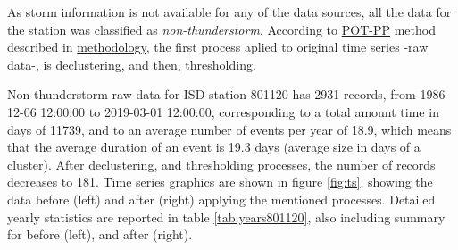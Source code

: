 \documentclass[12pt,oneside]{reedthesis}
\begin{document}
As storm information is not available for any of the data sources, all the data for the station was classified as \emph{non-thunderstorm}. According to \protect\hyperlink{pot-pp}{POT-PP} method described in \protect\hyperlink{rmd-method}{methodology}, the first process aplied to original time series -raw data-, is \protect\hyperlink{decluster}{declustering}, and then, \protect\hyperlink{thresholding}{thresholding}.

Non-thunderstorm raw data for ISD station 801120 has 2931 records, from 1986-12-06 12:00:00 to 2019-03-01 12:00:00, corresponding to a total amount time in days of 11739, and to an average number of events per year of 18.9, which means that the average duration of an event is 19.3 days (average size in days of a cluster). After \protect\hyperlink{decluster}{declustering}, and \protect\hyperlink{thresholding}{thresholding} processes, the number of records decreases to 181. Time series graphics are shown in figure \ref{fig:ts}, showing the data before (left) and after (right) applying the mentioned processes. Detailed yearly statistics are reported in table \ref{tab:years801120}, also including summary for before (left), and after (right).
\end{document}
